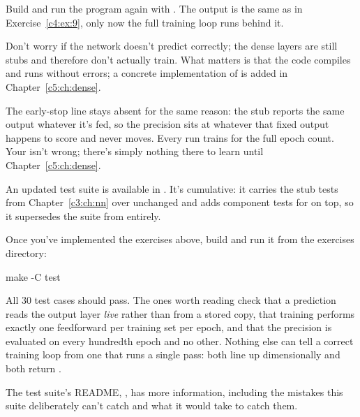 Build and run the program again with . The output is the same as in
Exercise~\ref{c4:ex:9}, only now the full training loop runs behind it.

Don't worry if the network doesn't predict correctly; the dense
layers are still stubs and therefore don't actually train. What matters is that the code compiles
and runs without errors; a concrete implementation of  is added in
Chapter~\ref{c5:ch:dense}.

The early-stop line stays absent for the same reason: the stub reports the same output whatever
it's fed, so the precision sits at whatever that fixed output happens to score and never moves.
Every run trains for the full epoch count. Your  isn't wrong; there's simply nothing
there to learn until Chapter~\ref{c5:ch:dense}.

\label{c4:ex:14}
An updated test suite is available in . It's cumulative:
it carries the stub tests from Chapter~\ref{c3:ch:nn} over unchanged and adds component tests for
 on top, so it supersedes the suite from  entirely.

Once you've implemented the exercises above, build and run it from the exercises directory:

\begin{shell}
make -C test
\end{shell}

\noindent All 30 test cases should pass. The ones worth reading check that a prediction reads the
output layer \emph{live} rather than from a stored copy, that training performs exactly one
feedforward per training set per epoch, and that the precision is evaluated on every hundredth
epoch and no other. Nothing else can tell a correct training loop from one that runs a single pass:
both line up dimensionally and both return .

The test suite's README, , has more
information, including the mistakes this suite deliberately can't catch and what it would take to
catch them.
